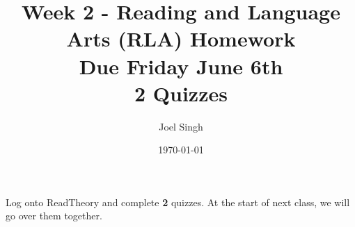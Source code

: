 \documentclass{article}
\title{Week 2 - Reading and Language Arts (RLA) Homework \\ Due Friday June 6th \\ 2 Quizzes}
\author{Joel Singh}
\date{\today}
\begin{document}
\maketitle
Log onto ReadTheory and complete \textbf{2} quizzes. At the start of next class, we will go over them together.
\end{document}
